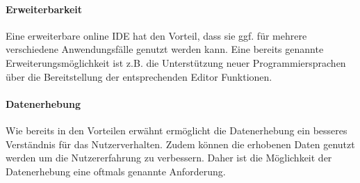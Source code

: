 \paragraph{Erweiterbarkeit}
Eine erweiterbare online IDE hat den Vorteil, dass sie ggf. für mehrere verschiedene Anwendungsfälle genutzt werden kann. Eine bereits genannte Erweiterungsmöglichkeit ist z.B. die Unterstützung neuer Programmiersprachen über die Bereitstellung der entsprechenden Editor Funktionen.

\paragraph{Datenerhebung}
Wie bereits in den Vorteilen erwähnt ermöglicht die Datenerhebung ein besseres Verständnis für das Nutzerverhalten. Zudem können die erhobenen Daten genutzt werden um die Nutzererfahrung zu verbessern. Daher ist die Möglichkeit der Datenerhebung eine oftmals genannte Anforderung.
